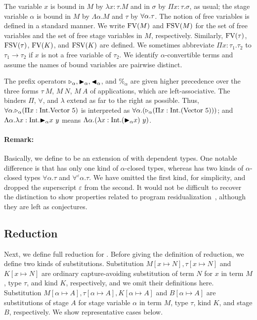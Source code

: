 
The variable $x$ is bound in $M$ by $\lambda x:\tau.M$ and in $\sigma$ by $\Pi
x:\tau.\sigma$, as usual; the stage variable $\alpha$ is bound in $M$ by
$\Lambda \alpha.M$ and $\tau$ by $\forall\alpha.\tau$.  The notion of free variables
is defined in a standard manner.  We write $\text{FV}(M)$ and $\text{FSV}(M)$ for the set
of free variables and the set of free stage variables in $M$, respectively.
Similarly, $\text{FV}(\tau)$, $\text{FSV}(\tau)$, $\text{FV}(K)$, and $\text{FSV}(K)$ are defined.  We
sometimes abbreviate $\Pi x:\tau_1.\tau_2$ to $\tau_1 \rightarrow \tau_2$ if
$x$ is not a free variable of $\tau_2$.  We identify $\alpha$-convertible terms
and assume the names of bound variables are pairwise distinct.


The prefix operators ${\mathop{\triangleright}}_\alpha, {\mathop{\blacktriangleright}}_\alpha, {\mathop{\blacktriangleleft}}_\alpha$, and $\%_\alpha$ are
given higher precedence over the three forms $\tau\ M$, $M\ N$, $M\ A$ of
applications, which are left-associative. The binders $\Pi$, $\forall$, and
$\lambda$ extend as far to the right as possible.  Thus, $\forall\alpha.{\mathop{\triangleright}}_{\alpha}
(\Pi x:\textrm{Int}.\text{Vector}\ 5)$ is interpreted as $\forall\alpha.({\mathop{\triangleright}}_{\alpha} (\Pi
x:\textrm{Int}.(\text{Vector}\ 5)))$; and $\Lambda\alpha.\lambda x:\textrm{Int}.{\mathop{\blacktriangleright}}_\alpha x\ y$
means $\Lambda\alpha.(\lambda x:\textrm{Int}.({\mathop{\blacktriangleright}}_\alpha x)\ y)$.


\paragraph{Remark:} Basically, we define \LMD to be an extension of \LTP with
dependent types. One notable difference is that \LMD has only one kind of
\(\alpha\)-closed types, whereas \LTP has two kinds of \(\alpha\)-closed types
\(\forall\alpha.\tau\) and \(\forall^\varepsilon\alpha.\tau\).  We have omitted
the first kind, for simplicity, and dropped the superscript $\varepsilon$ from
the second. It would not be difficult to recover the distinction to show
properties related to program residualization~\cite{Hanada2014}, although they
are left as conjectures.

\subsection{Reduction}


Next, we define full reduction for \LMD.  Before giving the definition of
reduction, we define two kinds of substitutions. Substitution $M[x\mapsto N],
\tau[x \mapsto N]$ and $K[x \mapsto N]$ are ordinary capture-avoiding
substitution of term $N$ for $x$ in term $M$, type $\tau$, and kind $K$,
respectively, and we omit their definitions here.  Substitution $M[\alpha
\mapsto A], \tau [\alpha \mapsto A], K[\alpha \mapsto A]$ and $B[\alpha\mapsto
A]$ are substitutions of stage $A$ for stage variable $\alpha$ in term $M$,
type $\tau$, kind $K$, and stage $B$, respectively.  We show representative
cases below.

